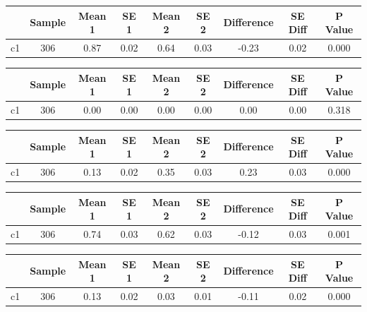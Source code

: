{
\def\sym#1{\ifmmode^{#1}\else\(^{#1}\)\fi}
\begin{tabular}{l*{1}{cccccccc}}
\hline\hline
            &      Sample&      Mean 1&        SE 1&      Mean 2&        SE 2&  Difference&     SE Diff&     P Value\\
\hline
c1          &         306&        0.87&        0.02&        0.64&        0.03&       -0.23&        0.02&       0.000\\
\hline\hline
\end{tabular}
}
{
\def\sym#1{\ifmmode^{#1}\else\(^{#1}\)\fi}
\begin{tabular}{l*{1}{cccccccc}}
\hline\hline
            &      Sample&      Mean 1&        SE 1&      Mean 2&        SE 2&  Difference&     SE Diff&     P Value\\
\hline
c1          &         306&        0.00&        0.00&        0.00&        0.00&        0.00&        0.00&       0.318\\
\hline\hline
\end{tabular}
}
{
\def\sym#1{\ifmmode^{#1}\else\(^{#1}\)\fi}
\begin{tabular}{l*{1}{cccccccc}}
\hline\hline
            &      Sample&      Mean 1&        SE 1&      Mean 2&        SE 2&  Difference&     SE Diff&     P Value\\
\hline
c1          &         306&        0.13&        0.02&        0.35&        0.03&        0.23&        0.03&       0.000\\
\hline\hline
\end{tabular}
}
{
\def\sym#1{\ifmmode^{#1}\else\(^{#1}\)\fi}
\begin{tabular}{l*{1}{cccccccc}}
\hline\hline
            &      Sample&      Mean 1&        SE 1&      Mean 2&        SE 2&  Difference&     SE Diff&     P Value\\
\hline
c1          &         306&        0.74&        0.03&        0.62&        0.03&       -0.12&        0.03&       0.001\\
\hline\hline
\end{tabular}
}
{
\def\sym#1{\ifmmode^{#1}\else\(^{#1}\)\fi}
\begin{tabular}{l*{1}{cccccccc}}
\hline\hline
            &      Sample&      Mean 1&        SE 1&      Mean 2&        SE 2&  Difference&     SE Diff&     P Value\\
\hline
c1          &         306&        0.13&        0.02&        0.03&        0.01&       -0.11&        0.02&       0.000\\
\hline\hline
\end{tabular}
}
